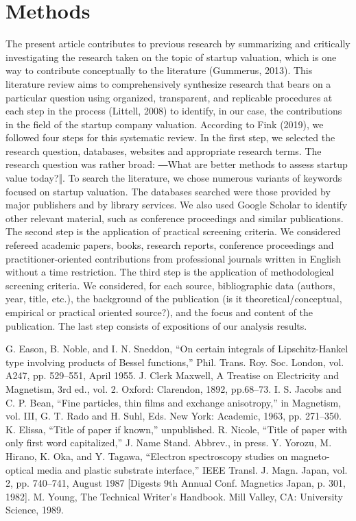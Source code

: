 \documentclass[conference]{IEEEtran}
\begin{document}
\section{Methods}
The present article contributes to previous research by summarizing and critically investigating the research taken on the topic of startup valuation, which is one way to contribute conceptually to the literature (Gummerus, 2013). This literature review aims to comprehensively synthesize research that bears on a particular question using organized, transparent, and replicable procedures at each step in the process (Littell, 2008) to identify, in our case, the contributions in the field of the startup company valuation.
According to Fink (2019), we followed four steps for this systematic review. In the first step, we selected the research question, databases, websites and appropriate research terms. The research question was rather broad: ―What are better methods to assess startup value today?‖. To search the literature, we chose numerous variants of keywords focused on startup valuation. The databases searched were those provided by major publishers and by library services. We also used Google Scholar to identify other relevant material, such as conference proceedings and similar publications. The second step is the application of practical screening criteria. We considered refereed academic papers, books, research reports, conference proceedings and practitioner-oriented contributions from professional journals written in English without a time restriction. The third step is the application of methodological screening criteria. We considered, for each source, bibliographic data (authors, year, title, etc.), the background of the publication (is it theoretical/conceptual, empirical or practical oriented source?), and the focus and content of the publication. The last step consists of expositions of our analysis results.
\begin{thebibliography}{00}
 G. Eason, B. Noble, and I. N. Sneddon, ``On certain integrals of Lipschitz-Hankel type involving products of Bessel functions,'' Phil. Trans. Roy. Soc. London, vol. A247, pp. 529--551, April 1955.
 J. Clerk Maxwell, A Treatise on Electricity and Magnetism, 3rd ed., vol. 2. Oxford: Clarendon, 1892, pp.68--73.
 I. S. Jacobs and C. P. Bean, ``Fine particles, thin films and exchange anisotropy,'' in Magnetism, vol. III, G. T. Rado and H. Suhl, Eds. New York: Academic, 1963, pp. 271--350.
 K. Elissa, ``Title of paper if known,'' unpublished.
 R. Nicole, ``Title of paper with only first word capitalized,'' J. Name Stand. Abbrev., in press.
 Y. Yorozu, M. Hirano, K. Oka, and Y. Tagawa, ``Electron spectroscopy studies on magneto-optical media and plastic substrate interface,'' IEEE Transl. J. Magn. Japan, vol. 2, pp. 740--741, August 1987 [Digests 9th Annual Conf. Magnetics Japan, p. 301, 1982].
 M. Young, The Technical Writer's Handbook. Mill Valley, CA: University Science, 1989.
\end{thebibliography}
\vspace{12pt}
\end{document}
